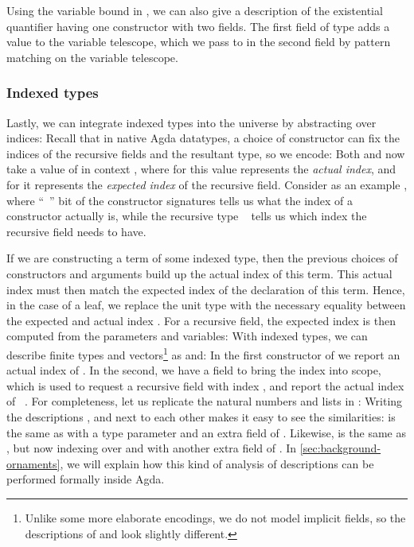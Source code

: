 Using the variable bound in , we can also give a description of the existential quantifier
having one constructor with two fields. The first field of type  adds a value  to the variable telescope, which we pass to  in the second field by pattern matching on the variable telescope.


\subsubsection{Indexed types}\label{ssec:background-ix}
Lastly, we can integrate indexed types \cite{iir} into the universe by abstracting over indices:
Recall that in native Agda datatypes, a choice of constructor can fix the indices of the recursive fields and the resultant type, so we encode:
Both  and  now take a value of  in context , where for  this value represents the \emph{actual index}, and for  it represents the \emph{expected index} of the recursive field. Consider as an example , where ``\ '' bit of the constructor signatures tells us what the index of a constructor actually is, while the recursive type \  tells us which index the recursive field needs to have.

If we are constructing a term of some indexed type, then the previous choices of constructors and arguments build up the actual index of this term. This actual index must then match the expected index of the declaration of this term. Hence, in the case of a leaf, we replace the unit type with the necessary equality between the expected  and actual index  \cite{algorn}. For a recursive field, the expected index  is then computed from the parameters and variables:
With indexed types, we can describe finite types and vectors\footnote{Unlike some more elaborate encodings, we do not model implicit fields, so the descriptions of  and  look slightly different.} as
and:
In the first constructor of  we report an actual index of . In the second, we have a field \bN{} to bring the index  into scope, which is used to request a recursive field with index , and report the actual index of \ . For completeness, let us replicate the natural numbers and lists in :
Writing the descriptions ,  and  next to each other makes it easy to see the similarities:  is the same as  with a type parameter and an extra field  of . Likewise,  is the same as , but now indexing over \bN{} and with another extra field  of \bN{}. In \autoref{sec:background-ornaments}, we will explain how this kind of analysis of descriptions can be performed formally inside Agda.

